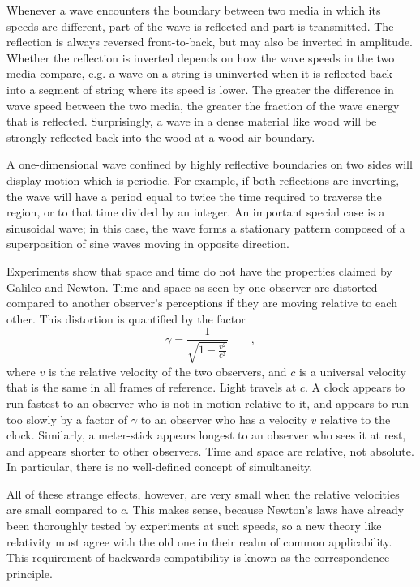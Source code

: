 	Whenever a wave encounters the boundary between two media in
	which its speeds are different, part of the wave is
	reflected and part is transmitted. The reflection is always
	reversed front-to-back, but may also be inverted in
	amplitude. Whether the reflection is inverted depends on how
	the wave speeds in the two media compare, e.g. a wave on a
	string  is uninverted when it is reflected back into a
	segment of string where its speed is lower. The greater the
	difference in wave speed between the two media, the greater
	the fraction of the wave energy that is reflected.
	Surprisingly, a wave in a dense material like wood will be
	strongly reflected back into the wood at a wood-air boundary.
	
	A one-dimensional wave confined by highly reflective
	boundaries on two sides will display motion which is
	periodic. For example, if both reflections are inverting,
	the wave will have a period equal to twice the time required
	to traverse the region, or to that time divided by an
	integer. An important special case is a sinusoidal wave; in
	this case, the wave forms a stationary pattern composed of a
	superposition of sine waves moving in opposite direction.

Experiments show that space and time do not have the properties claimed by Galileo and Newton.
Time and space as seen by one
observer are distorted compared to another observer's perceptions if they are moving
relative to each other. This distortion is quantified by the factor
\begin{equation*}
  \gamma = \frac{1}{\sqrt{1-\frac{v^2}{c^2}}} \qquad ,
\end{equation*}
where $v$ is the relative velocity of the two observers, and $c$ is a universal velocity
that is the same in all frames of reference. Light travels at $c$. A clock appears to run fastest to an
observer who is not in motion relative to it, and appears to run too slowly by a factor of
$\gamma$ to an observer who has a velocity $v$ relative to the clock. Similarly, a meter-stick
appears longest to an observer who sees it at rest, and appears shorter to other observers.
Time and space are relative, not absolute. In particular, there is no well-defined concept
of simultaneity.

All of these strange effects, however, are very small when the relative
velocities are small compared to $c$. This makes sense, because
Newton's laws have already been thoroughly tested by experiments at such speeds,
so a new theory like relativity must agree with the old one in their realm of
common applicability. This requirement of backwards-compatibility is known as
the correspondence principle.

